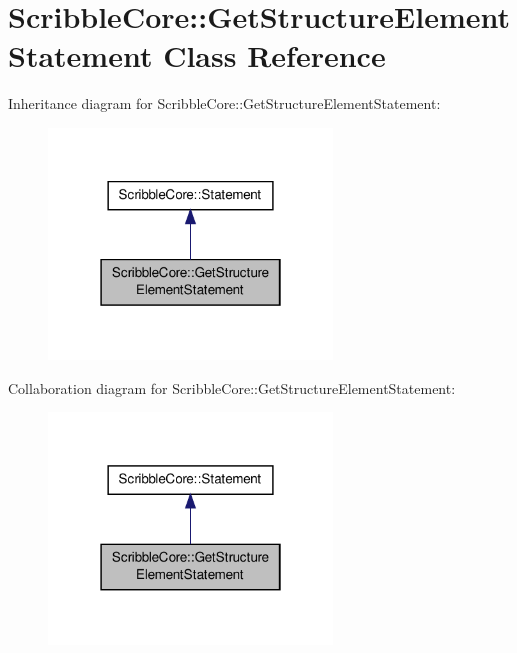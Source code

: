 \hypertarget{class_scribble_core_1_1_get_structure_element_statement}{\section{Scribble\-Core\-:\-:Get\-Structure\-Element\-Statement Class Reference}
\label{class_scribble_core_1_1_get_structure_element_statement}
}


Inheritance diagram for Scribble\-Core\-:\-:Get\-Structure\-Element\-Statement\-:\nopagebreak
\begin{figure}[H]
\begin{center}
\leavevmode
\includegraphics[width=214pt]{class_scribble_core_1_1_get_structure_element_statement__inherit__graph}
\end{center}
\end{figure}


Collaboration diagram for Scribble\-Core\-:\-:Get\-Structure\-Element\-Statement\-:\nopagebreak
\begin{figure}[H]
\begin{center}
\leavevmode
\includegraphics[width=214pt]{class_scribble_core_1_1_get_structure_element_statement__coll__graph}
\end{center}
\end{figure}
